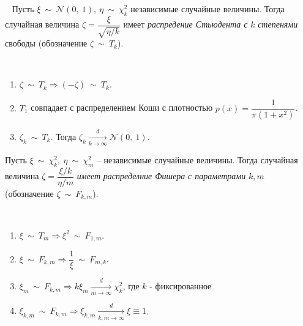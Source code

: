 \begin{definition} ~
    Пусть $\displaystyle \xi \ \sim \ \mathcal{N}( 0,\ 1) ,\ \eta \ \sim \ \chi _{k}^{2}$ независимые случайные величины. Тогда случайная величина $\displaystyle \zeta =\dfrac{\xi }{\sqrt{\eta /k}}$ имеет \textit{распредение Стьюдента с}\textit{ }$\displaystyle k$\textit{ степенями} свободы (обозначение $\displaystyle \zeta \ \sim \ T_{k}$).
\end{definition}
\begin{proposition} ~
    \begin{enumerate}
        \item $\displaystyle \zeta \ \sim \ T_{k} \Rightarrow ( -\zeta ) \ \sim \ T_{k}$.
        
        \item $\displaystyle T_{1}$ совпадает с распределением Коши с плотностью $\displaystyle p( x) =\dfrac{1}{\pi \left( 1+x^{2}\right)}$.
        
        \item $\displaystyle \zeta _{k} \ \sim \ T_{k}$. Тогда $\displaystyle \zeta _{k}\xrightarrow[k\rightarrow \infty ]{d}\mathcal{N}( 0,\ 1)$.
    \end{enumerate}
\end{proposition}
\begin{definition}
    Пусть $\displaystyle \xi \ \sim \ \chi _{k}^{2} ,\ \eta \ \sim \ \chi _{m}^{2}$ -- независимые случайные величины. Тогда случайная величина $\displaystyle \zeta =\dfrac{\xi /k}{\eta /m}$ \textit{имеет}\textit{ распределние Фишера }\textit{с параметрами}\textit{ }$\displaystyle k,m$ (обозначение $\displaystyle \zeta \ \sim \ F_{k,m}$).
\end{definition}
\begin{proposition} ~
    \begin{enumerate}
        \item $\displaystyle \xi \ \sim \ T_{m} \Rightarrow \xi ^{2} \ \sim \ F_{1,m}$.
        
        \item $\displaystyle \xi \ \sim \ F_{k,m} \Rightarrow \dfrac{1}{\xi } \ \sim \ F_{m,k}$.
        
        \item $\displaystyle \xi _{m} \ \sim \ F_{k,m} \Rightarrow k\xi _{m}\xrightarrow[m\rightarrow \infty ]{d} \chi _{k}^{2}$, где $k$ - фиксированное
        
        \item $\displaystyle \xi _{k,m} \ \sim \ F_{k,m} \Rightarrow \xi _{k,m}\xrightarrow[k,m\rightarrow \infty ]{d} \xi \equiv 1$.
    \end{enumerate}
\end{proposition}

